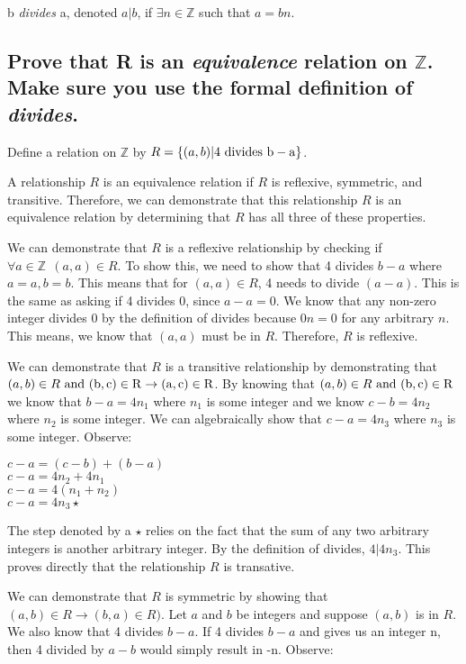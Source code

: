\begin{definition}
b \emph{divides} a, denoted $a | b$, if $\exists n \in \mathbb{Z}$ such that $a = bn$.
\end{definition}

\subsection{Prove that R is an \textit{equivalence} relation on $\mathbb{Z}$. Make sure you use the formal definition of \textit{divides}.}

Define a relation on $\mathbb{Z}$ by $R = \{(a, b) | 4 ~\rm{divides}~ b - a\}$.

A relationship $R$ is an equivalence relation if $R$ is reflexive, symmetric, and transitive. Therefore, we can demonstrate that this relationship $R$ is an equivalence relation by determining that $R$ has all three of these properties.

We can demonstrate that $R$ is a reflexive relationship by checking if $\forall a \in \mathbb{Z} ~~ (a,a) \in R$. To show this, we need to show that 4 divides $b - a$ where $a = a, b = b$. This means that for $(a,a) \in R$, 4 needs to divide $(a-a)$. This is the same as asking if 4 divides 0, since $a-a = 0$. We know that any non-zero integer divides 0 by the definition of divides because $0n = 0$ for any arbitrary $n$. This means, we know that $(a,a)$ must be in $R$. Therefore, $R$ is reflexive.

We can demonstrate that $R$ is a transitive relationship by demonstrating that $(a,b) \in R ~\rm{and}~ (b,c) \in R \rightarrow (a,c) \in R$. By knowing that $(a,b) \in R ~\rm{and}~ (b,c) \in R$ we know that $b-a = 4n_1$ where $n_1$ is some integer and we know $c-b = 4n_2$ where $n_2$ is some integer. We can algebraically show that $c-a = 4n_3$ where $n_3$ is some integer. Observe:

\begin{center}
    $c-a = (c-b) + (b-a)$ \\
    $c-a = 4n_2 + 4n_1$ \\
    $c-a = 4(n_1 + n_2)$ \\
    $c-a = 4n_3 \star$
\end{center}

The step denoted by a $\star$ relies on the fact that the sum of any two arbitrary integers is another arbitrary integer. By the definition of divides, $4 | 4n_3$. This proves directly that the relationship $R$ is transative.

We can demonstrate that $R$ is symmetric by showing that $(a,b) \in R \rightarrow (b,a) \in R)$. Let $a$ and $b$ be integers and suppose $(a,b)$ is in $R$. We also know that 4 divides $b - a$. If 4 divides $b - a$ and gives us an integer n, then 4 divided by $a - b$ would simply result in -n. Observe:

